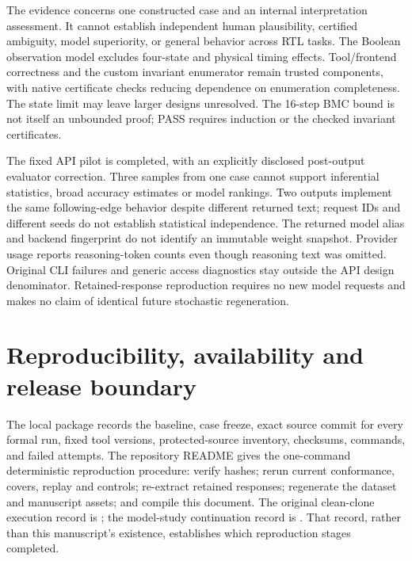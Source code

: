 \documentclass[11pt,a4paper]{article}
\begin{document}
\begin{table}[ht]
\centering\small
\caption{Observed reference-choice sensitivity for the three API samples. Set acceptance is conditional on the internally admitted interpretations.}
\label{tab:acceptance}
\end{table}

The evidence concerns one constructed case and an internal interpretation assessment. It cannot establish independent human plausibility, certified ambiguity, model superiority, or general behavior across RTL tasks. The Boolean observation model excludes four-state and physical timing effects. Tool/frontend correctness and the custom invariant enumerator remain trusted components, with native certificate checks reducing dependence on enumeration completeness. The state limit may leave larger designs unresolved. The 16-step BMC bound is not itself an unbounded proof; PASS requires induction or the checked invariant certificates.

The fixed API pilot is completed, with an explicitly disclosed post-output evaluator correction. Three samples from one case cannot support inferential statistics, broad accuracy estimates or model rankings. Two outputs implement the same following-edge behavior despite different returned text; request IDs and different seeds do not establish statistical independence. The returned model alias and backend fingerprint do not identify an immutable weight snapshot. Provider usage reports reasoning-token counts even though reasoning text was omitted. Original CLI failures and generic access diagnostics stay outside the API design denominator. Retained-response reproduction requires no new model requests and makes no claim of identical future stochastic regeneration.

\section{Reproducibility, availability and release boundary}
The local package records the baseline, case freeze, exact source commit for every formal run, fixed tool versions, protected-source inventory, checksums, commands, and failed attempts. The repository README gives the one-command deterministic reproduction procedure: verify hashes; rerun current conformance, covers, replay and controls; re-extract retained responses; regenerate the dataset and manuscript assets; and compile this document. The original clean-clone execution record is ; the model-study continuation record is . That record, rather than this manuscript's existence, establishes which reproduction stages completed.
\end{document}
